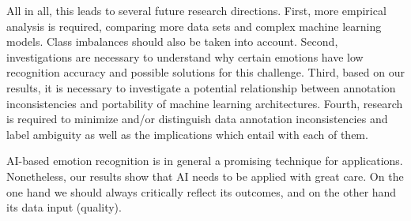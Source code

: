 \documentclass[a4paper, conference]{IEEEtran}
\begin{document}
All in all, this leads to several future research directions. First, more empirical analysis is required, comparing more data sets and complex machine learning models. Class imbalances should also be taken into account. Second, investigations are necessary to understand why certain emotions have low recognition accuracy and possible solutions for this challenge. Third, based on our results, it is necessary to investigate a potential relationship between annotation inconsistencies and portability of machine learning architectures. Fourth, research is required to minimize and/or distinguish data annotation inconsistencies and label ambiguity as well as the implications which entail with each of them.

AI-based emotion recognition is in general a promising technique for applications. Nonetheless, our results show that AI needs to be applied with great care. On the one hand we should always critically reflect its outcomes, and on the other hand its data input (quality).




\newpage



\end{document}
